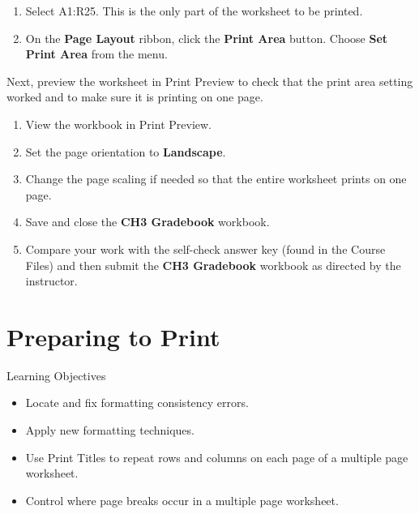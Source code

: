 \begin{enumerate}
	\item Select \textsf{A1:R25}. This is the only part of the worksheet to be printed.
	\item On the \textbf{Page Layout} ribbon, click the \textbf{Print Area} button. Choose \textbf{Set Print Area} from the menu.
\end{enumerate}

Next, preview the worksheet in Print Preview to check that the print area setting worked and to make sure it is printing on one page.

\begin{enumerate}
	\item View the workbook in Print Preview.
	\item Set the page orientation to \textbf{Landscape}.
	\item Change the page scaling if needed so that the entire worksheet prints on one page.
	\item Save and close the \textbf{CH3 Gradebook} workbook.
	\item Compare your work with the self-check answer key (found in the Course Files) and then submit the \textbf{CH3 Gradebook} workbook as directed by the instructor.
\end{enumerate}

\section{Preparing to Print}

\begin{center}
	\begin{objbox}{Learning Objectives}
		\begin{itemize}
			\setlength{\itemsep}{0pt}
			\setlength{\parskip}{0pt}
			\setlength{\parsep}{0pt}

			\item Locate and fix formatting consistency errors.
			\item Apply new formatting techniques.
			\item Use Print Titles to repeat rows and columns on each page of a multiple page worksheet.
			\item Control where page breaks occur in a multiple page worksheet.
			
		\end{itemize}
	\end{objbox}
\end{center}

